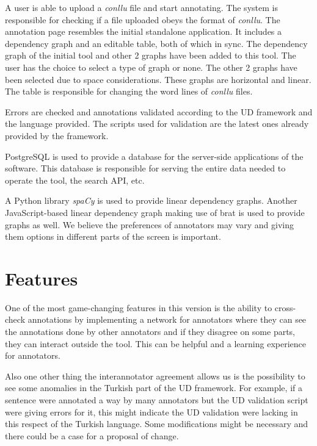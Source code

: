 \documentclass[
]{ceurart}
\begin{document}
A user is able to upload a \textit{conllu} file and start annotating.
The system is responsible for checking if a file uploaded obeys the format of \textit{conllu}.
The annotation page resembles the initial standalone application.
It includes a dependency graph and an editable table, both of which in sync.
The dependency graph of the initial tool and other 2 graphs have been added to this tool.
The user has the choice to select a type of graph or none.
The other 2 graphs have been selected due to space considerations.
These graphs are horizontal and linear.
The table is responsible for changing the word lines of \textit{conllu} files.

Errors are checked and annotations validated according to the UD framework and the language provided.
The scripts used for validation are the latest ones already provided by the framework.\cite{UD-git}

PostgreSQL\cite{psql} is used to provide a database for the server-side applications of the software.
This database is responsible for serving the entire data needed to operate the tool, the search API, etc.

A Python library \textit{spaCy}\cite{spacy} is used to provide linear dependency graphs.
Another JavaScript-based linear dependency graph\cite{spyssalo} making use of brat\cite{brat-vis} is used to provide graphs as well.
We believe the preferences of annotators may vary and giving them options in different parts of the screen is important.

\section{Features}

One of the most game-changing features in this version is the ability to cross-check annotations by implementing a network for annotators where they can see the annotations done by other annotators and if they disagree on some parts, they can interact outside the tool.
This can be helpful and a learning experience for annotators.

Also one other thing the interannotator agreement allows us is the possibility to see some anomalies in the Turkish part of the UD framework.
For example, if a sentence were annotated a way by many annotators but the UD validation script were giving errors for it, this might indicate the UD validation were lacking in this respect of the Turkish language.
Some modifications might be necessary and there could be a case for a proposal of change.
\end{document}
